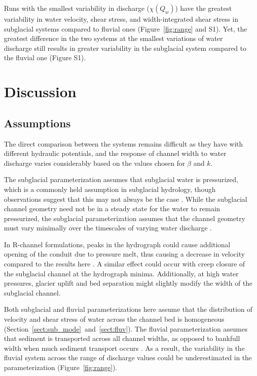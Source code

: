 \documentclass[11pt]{article}
\begin{document}
\begin{spacing}{1}
  Runs with the smallest variability in discharge ($\chi(Q_w)$) have the greatest variability in water velocity, shear stress, and width-integrated shear stress in subglacial systems compared to fluvial ones (Figure~\ref{fig:range} and S1).
  Yet, the greatest difference in the two systems at the smallest variations of water discharge still results in greater variability in the subglacial system compared to the fluvial one (Figure S1). 

  
  \section{Discussion}
  \subsection{Assumptions}
  
  The direct comparison between the systems remains difficult as they have with different hydraulic potentials, and the response of channel width to water discharge varies considerably based on the values chosen for $\beta$ and $k$.
  
  The subglacial parameterization assumes that subglacial water is pressurized, which is a commonly held assumption in subglacial hydrology, though observations suggest that this may not always be the case \citep[e.g.][]{gimbert2016}.
  While the subglacial channel geometry need not be in a steady state for the water to remain pressurized, the subglacial parameterization assumes that the channel geometry must vary minimally over the timescales of varying  water discharge \citep[e.g.][]{nanni2020}.
  
  In R-channel formulations, peaks in the hydrograph could cause additional opening of the conduit due to pressure melt, thus causing a decrease in velocity compared to the results here \citep{rothlisberger1972}.
  A similar effect could occur with creep closure of the subglacial channel at the hydrograph minima.
  Additionally, at high water pressures, glacier uplift and bed separation \citep{andrews2014} might slightly modify the width of the subglacial channel. 

  Both subglacial and fluvial parameterizations here assume that the distribution of velocity and shear stress of water across the channel bed is homogeneous (Section~\ref{sect:sub_mode}~and~\ref{sect:fluv}). 
  The fluvial parameterization assumes that sediment is transported across all channel widths, as opposed to bankfull width when much sediment transport occurs \citep{wolman1960}.
  As a result, the variability in the fluvial system across the range of discharge values could be underestimated in the parameterization (Figure~\ref{fig:range}).
  

\end{spacing}
\end{document}
